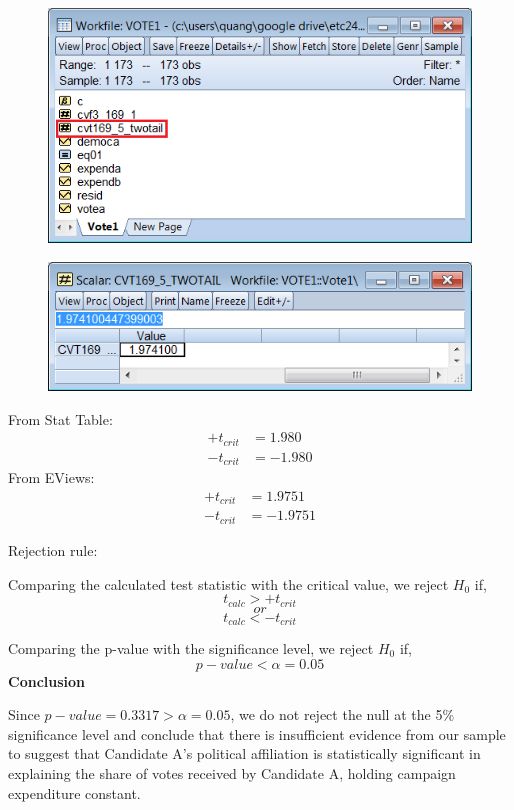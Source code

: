 \documentclass[12pt]{report}
\begin{document}
\vspace{-\baselineskip}
\begin{figure}[H]
	\centering
	\includegraphics{q1_13}
\end{figure}
\vspace{-\baselineskip}
\begin{figure}[H]
	\centering
	\includegraphics{q1_14}
\end{figure}
\vspace{-\baselineskip}
\noindent From Stat Table:
\begin{align*}
	+t_{crit} &= 1.980 \\
	-t_{crit} &= -1.980
\end{align*}
\noindent From EViews:
\begin{align*}
	+t_{crit} &= 1.9751 \\
	-t_{crit} &= -1.9751
\end{align*}

\noindent Rejection rule: 

\noindent Comparing the calculated test statistic with the critical value, we reject $H_0$ if,
$$t_{calc} > +t_{crit}$$
$$or$$
$$t_{calc} < -t_{crit}$$

\noindent Comparing the p-value with the significance level, we reject $H_0$ if,
$$p-value < \alpha = 0.05$$
\noindent \textbf{Conclusion}

\noindent Since $p-value = 0.3317 > \alpha = 0.05$, we do not reject the null at the 5\% significance level and conclude that there is insufficient evidence from our sample to suggest that Candidate A’s political affiliation is statistically significant in explaining the share of votes received by Candidate A, holding campaign expenditure constant.
\end{document}
